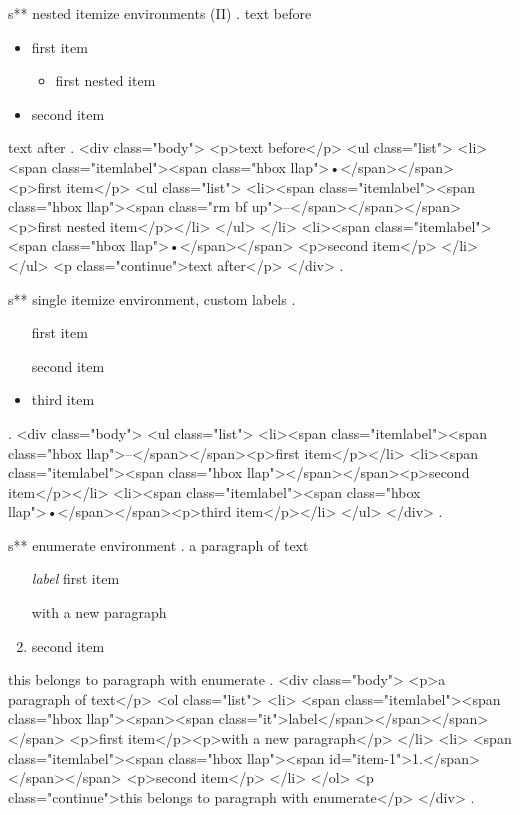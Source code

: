 s** nested itemize environments (II)
.
text before
\begin{itemize}
    \item first item
        \begin{itemize}
            \item first nested item
        \end{itemize}
    \item second item
\end{itemize}
text after
.
<div class="body">
<p>text before</p>
<ul class="list">
<li><span class="itemlabel"><span class="hbox llap">•</span></span>
<p>ﬁrst item</p>
<ul class="list">
<li><span class="itemlabel"><span class="hbox llap"><span class="rm bf up">–</span></span></span><p>ﬁrst nested item</p></li>
</ul>
</li>
<li><span class="itemlabel"><span class="hbox llap">•</span></span>
<p>second item</p>
</li>
</ul>
<p class="continue">text after</p>
</div>
.


s** single itemize environment, custom labels
.
\begin{itemize}
    \item[\textendash] first item
    \item[] second item
    \item third item
\end{itemize}
.
<div class="body">
<ul class="list">
<li><span class="itemlabel"><span class="hbox llap">–</span></span><p>ﬁrst item</p></li>
<li><span class="itemlabel"><span class="hbox llap"></span></span><p>second item</p></li>
<li><span class="itemlabel"><span class="hbox llap">•</span></span><p>third item</p></li>
</ul>
</div>
.



s** enumerate environment
.
a paragraph of text

\begin{enumerate}
    \item[\itshape label] first item

        with a new paragraph
    \item second item
\end{enumerate}
this belongs to paragraph with enumerate
.
<div class="body">
<p>a paragraph of text</p>
<ol class="list">
<li>
<span class="itemlabel"><span class="hbox llap"><span><span class="it">label</span></span></span></span>
<p>ﬁrst item</p><p>with a new paragraph</p>
</li>
<li>
<span class="itemlabel"><span class="hbox llap"><span id="item-1">1.</span></span></span>
<p>second item</p>
</li>
</ol>
<p class="continue">this belongs to paragraph with enumerate</p>
</div>
.


